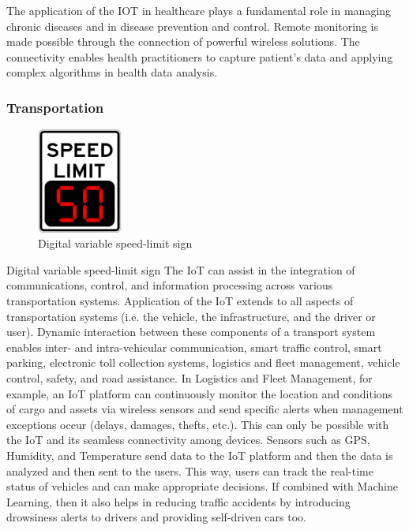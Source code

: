 \documentclass[12pt, a4paper, twoside]{article}
\begin{document}
The application of the IOT in healthcare plays a fundamental role in managing chronic diseases and in disease prevention and control. Remote monitoring is made possible through the connection of powerful wireless solutions. The connectivity enables health practitioners to capture patient's data and applying complex algorithms in health data analysis.

\subsubsection{Transportation}
\begin{figure} %
    \centering
    \includegraphics[width=0.25\textwidth]{dvs}
    \caption{Digital variable speed-limit sign}
\end{figure}
Digital variable speed-limit sign
The IoT can assist in the integration of communications, control, and information processing across various transportation systems. Application of the IoT extends to all aspects of transportation systems (i.e. the vehicle, the infrastructure, and the driver or user). Dynamic interaction between these components of a transport system enables inter- and intra-vehicular communication, smart traffic control, smart parking, electronic toll collection systems, logistics and fleet management, vehicle control, safety, and road assistance. In Logistics and Fleet Management, for example, an IoT platform can continuously monitor the location and conditions of cargo and assets via wireless sensors and send specific alerts when management exceptions occur (delays, damages, thefts, etc.). This can only be possible with the IoT and its seamless connectivity among devices. Sensors such as GPS, Humidity, and Temperature send data to the IoT platform and then the data is analyzed and then sent to the users. This way, users can track the real-time status of vehicles and can make appropriate decisions. If combined with Machine Learning, then it also helps in reducing traffic accidents by introducing drowsiness alerts to drivers and providing self-driven cars too.
\end{document}
